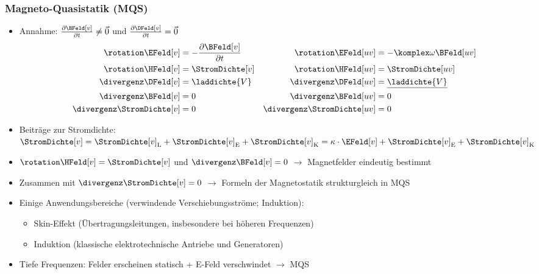 \begin{frame}
  \frametitle{Magneto-Quasistatik (MQS)}
  \begin{itemize}[<+->]
  \item Annahme: $\frac{\partial \BFeld[v]}{\partial t} \ne \vec{0}$ und $\frac{\partial \DFeld[v]}{\partial t} = \vec{0}$
    \begin{align*}
 	\rotation \EFeld[v] & = -\frac{\partial \BFeld[v]}{\partial t}  & \rotation \EFeld[uv] & = -\komplex\omega\BFeld[uv] \\
 	\rotation \HFeld[v] & = \StromDichte[v] & \rotation \HFeld[uv] & = \StromDichte[uv] \\
 	\divergenz \DFeld[v] &= \laddichte{V} & \divergenz \DFeld[uv] &= \underline{\laddichte{V}}\\
      \divergenz \BFeld[v] &= 0 & \divergenz \BFeld[uv] &= 0\\
      \divergenz \StromDichte[v] &=0 & \divergenz \StromDichte[uv] &=0
    \end{align*}
  \item Beiträge zur Stromdichte: $\StromDichte[v] = \StromDichte[v]_\mathrm{L} + \StromDichte[v]_\mathrm{E} + \StromDichte[v]_\mathrm{K} = \kappa \cdot \EFeld[v] + \StromDichte[v]_\mathrm{E} + \StromDichte[v]_\mathrm{K} $
  \item $\rotation \HFeld[v]  = \StromDichte[v]$ und $\divergenz \BFeld[v] = 0$ $\to$ Magnetfelder eindeutig bestimmt
    \item Zusammen mit $\divergenz \StromDichte[v] =0$ $\to$ Formeln der Magnetostatik strukturgleich in MQS 
  \item Einige Anwendungsbereiche (verwindende Verschiebungsströme; Induktion):
      \begin{itemize}[<+->]
      \item Skin-Effekt (Übertragungsleitungen, insbesondere bei höheren Frequenzen)
      \item Induktion (klassische elektrotechnische Antriebe und Generatoren)
        \end{itemize}
        \item Tiefe Frequenzen: Felder erscheinen statisch + E-Feld verschwindet $\to$ \alert{MQS}
  \end{itemize}
\end{frame}


